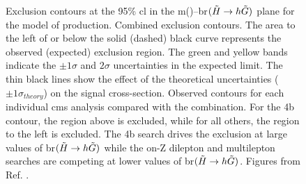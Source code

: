 \begin{figure}[htbp]
	\centering 
	\caption{
	Exclusion contours at the 95\% \gls{cl} in the m(\ninoone)--\gls{br}$(\tilde{H}\rightarrow h \tilde{G})$ plane for the model of \ninoone\ninoone production.
	Combined exclusion contours. The area to the left of or below the solid (dashed) black curve represents the observed (expected) exclusion region. The green and yellow bands indicate the $\pm1\sigma$ and $2\sigma$ uncertainties in the expected limit. The thin black lines show the effect of the theoretical uncertainties ($\pm1\sigma_{theory}$) on the signal cross-section.
	Observed contours for each individual \gls{cms} analysis compared with the combination. For the 4b contour, the region above is excluded, while for all others, the region to the left is excluded. The 4b search drives the exclusion at large values of \gls{br}$(\tilde{H}\rightarrow h \tilde{G})$ while the on-Z dilepton and multilepton searches are competing at lower values of \gls{br}$(\tilde{H}\rightarrow h \tilde{G})$.
	Figures from Ref. \cite{Sirunyan:2018ubx}.
		}
	\label{fig:limits_higgsino_cms}
\end{figure}

